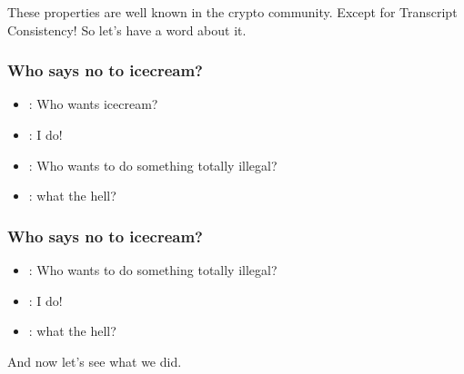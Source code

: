 \begin{frame}
These properties are well known in the crypto community.
\vfill
Except for Transcript Consistency!
\vfill
So let's have a word about it.
\end{frame}

\begin{frame}
  \frametitle{Who says no to icecream?}
    \begin{itemize}
      \item[] \mandragore: Who wants icecream?
      \item[] \noscope: I do!
      \item[] \mandragore: Who wants to do something totally illegal?
      \item[] \vulpecula: what the hell?
    \end{itemize}
\end{frame}

\begin{frame}
  \frametitle{Who says no to icecream?}
    \begin{itemize}
      \item[] \mandragore: Who wants to do something totally illegal?
      \item[] \noscope: I do!
      \item[] \vulpecula: what the hell?
    \end{itemize}
\end{frame}

\begin{frame}
  And now let's see what we did.
\end{frame}
